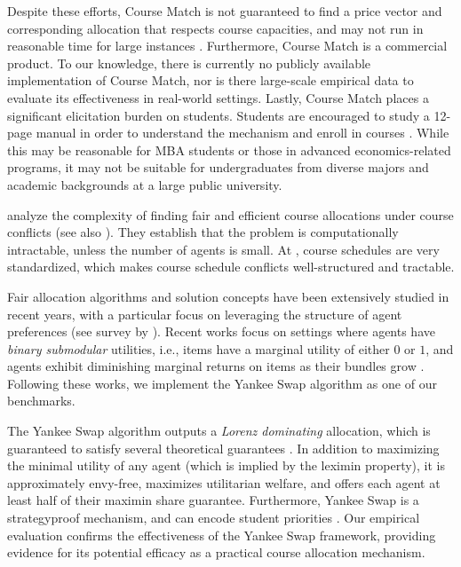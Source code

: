 Despite these efforts, Course Match is not guaranteed to find a price vector and corresponding allocation that respects course capacities, and may not run in reasonable time for large instances \cite{budish2017coursematch}. 
Furthermore, Course Match is a commercial product. 
To our knowledge, there is currently no publicly available implementation of Course Match, nor is there large-scale empirical data to evaluate its effectiveness in real-world settings. 
Lastly, Course Match places a significant elicitation burden on students. 
Students are encouraged to study a 12-page manual in order to understand the mechanism and enroll in courses \cite{coursematchmanual2020}. 
While this may be reasonable for MBA students or those in advanced economics-related programs, it may not be suitable for undergraduates from diverse majors and academic backgrounds at a large public university. 

\citet{biswas2023algorithmic} analyze the complexity of finding fair and efficient course allocations under course conflicts (see also \cite{biswas2024fair}). They establish that the problem is computationally intractable, unless the number of agents is small. At \UMass, course schedules are very standardized, which makes course schedule conflicts well-structured and tractable. 

Fair allocation algorithms and solution concepts have been extensively studied in recent years, with a particular focus on leveraging the structure of agent preferences (see survey by \citet{aziz2022fairallocationsurvey}). 
Recent works focus on settings where agents have \emph{binary submodular} utilities, i.e., items have a marginal utility of either $0$ or $1$, and agents exhibit diminishing marginal returns on items as their bundles grow \cite{babaioff2021EF,barman2021matroid,garg2020mms,benabbou2021MRF,viswanathan2023yankeeswap,viswanathan2023general}.
Following these works, we implement the Yankee Swap algorithm \cite{viswanathan2023yankeeswap} as one of our benchmarks. 

The Yankee Swap algorithm outputs a \emph{Lorenz dominating} allocation, which is guaranteed to satisfy several theoretical guarantees \cite{babaioff2021EF,benabbou2021MRF}. In addition to maximizing the minimal utility of any agent (which is implied by the leximin property), it is approximately envy-free, maximizes utilitarian welfare, and offers each agent at least half of their maximin share guarantee. Furthermore, Yankee Swap is a strategyproof mechanism, and can encode student priorities \cite{viswanathan2023general}. Our empirical evaluation confirms the effectiveness of the Yankee Swap framework, providing evidence for its potential efficacy as a practical course allocation mechanism.
